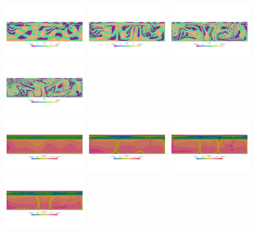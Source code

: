 \begin{center}
\includegraphics[width=3.5cm]{python_codes/fieldstone_88/results/model3/m0004.png}
\includegraphics[width=3.5cm]{python_codes/fieldstone_88/results/model3/m0009.png}
\includegraphics[width=3.5cm]{python_codes/fieldstone_88/results/model3/m0014.png}
\includegraphics[width=3.5cm]{python_codes/fieldstone_88/results/model3/m0019.png}\\
\includegraphics[width=3.5cm]{python_codes/fieldstone_88/results/model3/v0000.png}
\includegraphics[width=3.5cm]{python_codes/fieldstone_88/results/model3/v0004.png}
\includegraphics[width=3.5cm]{python_codes/fieldstone_88/results/model3/v0009.png}
\includegraphics[width=3.5cm]{python_codes/fieldstone_88/results/model3/v0014.png}

\end{center}
